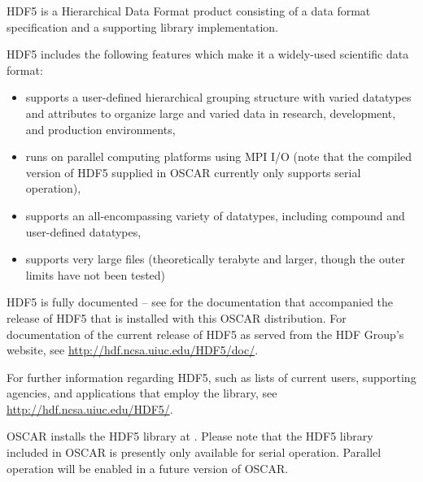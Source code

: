 %
%
% 
% 
% 
% 
%

HDF5 is a Hierarchical Data Format product consisting of a data format
specification and a supporting library implementation.

HDF5 includes the following features which make it a widely-used
scientific data format:

\begin{itemize}
\item supports a user-defined hierarchical grouping structure with
  varied datatypes and attributes to organize large and varied data in
  research, development, and production environments,


\item runs on parallel computing platforms using MPI I/O (note that
  the compiled version of HDF5 supplied in OSCAR currently only
  supports serial operation),

\item supports an all-encompassing variety of datatypes, including
  compound and user-defined datatypes,

\item supports very large files (theoretically terabyte and larger,
  though the outer limits have not been tested)
\end{itemize}

HDF5 is fully documented -- see
 for the
documentation that accompanied the release of HDF5 that is installed
with this OSCAR distribution.  For documentation of the current
release of HDF5 as served from the HDF Group's website, see
\url{http://hdf.ncsa.uiuc.edu/HDF5/doc/}.

For further information regarding HDF5, such as lists of current
users, supporting agencies, and applications that employ the library,
see \url{http://hdf.ncsa.uiuc.edu/HDF5/}.


OSCAR installs the HDF5 library at
.  Please note that the HDF5
library included in OSCAR is presently only available for serial
operation.  Parallel operation will be enabled in a future version of
OSCAR.


